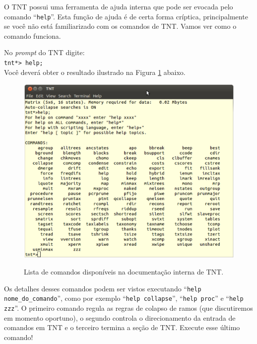 \begin{refsection}
O TNT possui uma ferramenta de ajuda interna que pode ser evocada pelo comando ``\texttt{help}''. Esta função de ajuda é de certa forma críptica, principalmente se você não está familiarizado com os comandos de TNT. Vamos ver como o comando funciona.

No \textit{prompt} do TNT digite:\\

\indent\indent\texttt{tnt*> help;}\\

Você deverá obter o resultado ilustrado na Figura \ref{tut4:fig:tnt_help} abaixo. 
\\
  \begin{figure}[H]
       \centering
      {\includegraphics[scale=0.40]{figures/tut4/tnt_help.eps}}
      {\caption[\textit{\textit{Ajuda para comandos de TNT} }]{Lista de comandos disponíveis na documentação interna de TNT.}\label{tut4:fig:tnt_help}}
  \end{figure}


Os detalhes desses comandos podem ser vistos executando ``\texttt{help nome\_do\_comando}'', como por exemplo ``\texttt{help collapse}'', ``\texttt{help proc}'' e ``\texttt{help zzz}''. O primeiro comando regula as regras de colapso de ramos (que discutiremos em momento oportuno), o segundo controla o direcionamento da entrada de comandos em TNT e o terceiro termina a seção de TNT. Execute esse último comando!\\


\end{refsection}

